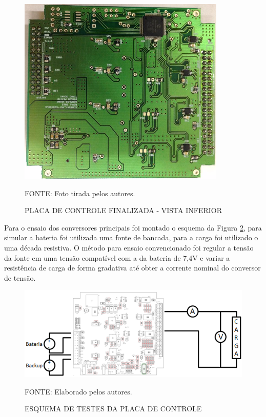 \documentclass[
	12pt,				%
	openright,			%
	oneside,			%
	a4paper,			%
	english,			%
	french,				%
	spanish,			%
	brazil,				%
	oldfontcommands
	]{abntex2}
\begin{document}
	\begin{figure}[th]
		\caption{PLACA DE CONTROLE FINALIZADA - VISTA INFERIOR}
		\label{Fig_esq_cont}
		\centering
		\includegraphics[width=0.6\linewidth]{./figs/cont_bottom}
			
		\begin{small}
			FONTE: Foto tirada pelos autores.
		\end{small}
	\end{figure}
	\pagebreak
	Para o ensaio dos conversores principais foi montado o esquema da Figura \ref{Fig_esq_cont}, para simular a bateria foi utilizada uma fonte de bancada, para a carga foi utilizado o uma década resistiva. O método para ensaio convencionado foi regular a tensão da fonte em uma tensão compatível com a da bateria de 7,4V e variar a resistência de carga de forma gradativa até obter a corrente nominal do conversor de tensão.
		
	\begin{figure}[th]
		\caption{ESQUEMA DE TESTES DA PLACA DE CONTROLE}
		\label{Fig_esq_cont}
		\centering
		\includegraphics[width=1.0\linewidth]{./figs/esq_cont}
			
		\begin{small}
			FONTE: Elaborado pelos autores.
		\end{small}
	\end{figure}
	
\end{document}
